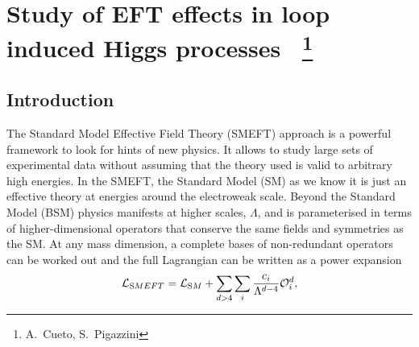 \newcommand{\cpDC}{\ensuremath{c_{pDC}}\xspace}
\newcommand{\cpG}{\ensuremath{c_{pG}}\xspace}
\newcommand{\cdp}{\ensuremath{c_{dp}}\xspace}
\newcommand{\cpe}{\ensuremath{c_{pe}}\xspace}
\newcommand{\cpl}[1]{\ensuremath{c_{pl#1}}\xspace}
\newcommand{\cpmu}{\ensuremath{c_{pmu}}\xspace}
\newcommand{\cpqi}{\ensuremath{c_{pq3i}}\xspace}
\newcommand{\ctpl}[1]{\ensuremath{c_{3pl#1}}\xspace}
\newcommand{\cpd}{\ensuremath{c_{pd}}\xspace}
\newcommand{\cpQ}{\ensuremath{c_{pQ3}}\xspace}
\newcommand{\cpQM}{\ensuremath{c_{pQM}}\xspace}
\newcommand{\cpqMi}{\ensuremath{c_{pqMi}}\xspace}
\newcommand{\cpt}{\ensuremath{c_{pt}}\xspace}
\newcommand{\cpu}{\ensuremath{c_{pu}}\xspace}
\newcommand{\ctG}{\ensuremath{c_{tG}}\xspace}
\newcommand{\ctp}{\ensuremath{c_{tp}}\xspace}
\newcommand{\cpW}{\ensuremath{c_{pW}}\xspace}
\newcommand{\cpBB}{\ensuremath{c_{pBB}}\xspace}
\newcommand{\cpWB}{\ensuremath{c_{pWB}}\xspace}
\newcommand{\ctB}{\ensuremath{c_{tB}}\xspace}
\newcommand{\ctW}{\ensuremath{c_{tW}}\xspace}
\newcommand{\cll}{\ensuremath{c_{ll}}\xspace}



\section{Study of EFT effects in loop induced Higgs processes ~\protect\footnote{
  A.~Cueto,
  S.~Pigazzini}{}}

\label{sec:projname}



\subsection{Introduction}
\label{sec:higgseft:section1}
The Standard Model Effective Field Theory (SMEFT) approach is a powerful framework to look for hints of new physics. It allows to study large sets of experimental data without assuming that the theory used is valid to arbitrary high energies. In the SMEFT, the Standard Model (SM) as we know it is just an effective theory at energies around the electroweak scale. Beyond the Standard Model (BSM) physics manifests at higher scales, $\Lambda$, and is parameterised in terms of higher-dimensional operators that conserve the same fields and symmetries as the SM. At any mass dimension, a complete bases of non-redundant operators can be worked out and the full Lagrangian can be written as a power expansion
\begin{equation}
\mathcal{L}_{\textrm SMEFT} = \mathcal{L}_{\textrm SM} + \sum_{d>4}\sum_{i}\frac{c_i}{\Lambda^{d-4}}\mathcal{O}_{i}^{d},
\end{equation}  

